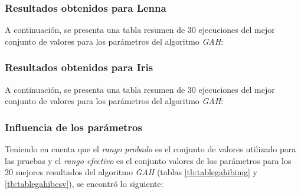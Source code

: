 \subsubsection{Resultados obtenidos para \textbf{Lenna}}

    A continuación, se presenta una tabla resumen de 30 ejecuciones del mejor
conjunto de valores para los parámetros del algoritmo \emph{GAH}:



\subsubsection{Resultados obtenidos para \textbf{Iris}}

    A continuación, se presenta una tabla resumen de 30 ejecuciones del mejor
conjunto de valores para los parámetros del algoritmo \emph{GAH}:



\subsubsection{Influencia de los parámetros}

Teniendo en cuenta que el \emph{rango probado} es el conjunto de valores utilizado
para las pruebas y el \emph{rango efectivo} es el conjunto valores de los parámetros
para los 20 mejores resultados del algoritmo \emph{GAH} (tablas \ref{tb:tablegahibimg}
y \ref{tb:tablegahibcsv}), se encontró lo siguiente:

